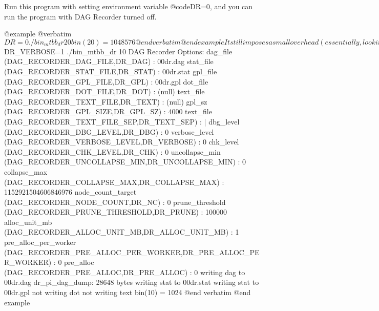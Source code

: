 Run this program with setting environment variable @code{DR=0}, and you
can run the program with DAG Recorder turned off.

@example 
@verbatim
$ DR=0 ./bin_mtbb_dr 20
bin(20) = 1048576
@end verbatim
@end example

It still imposes a small overhead (essentially, looking up a global
variable + branch) for each tasking primitive.  We believe this overhead
is rarely an issue, but if you want to completely eliminate this
overhead, compile the program without @code{DAG_RECORDER=2}.

@node Controlling the Behavior of DAG Recorder,  , Basics of Running Your Programs with DAG Recorder, Running Your Programs with DAG Recorder
@subsection Controlling the Behavior of DAG Recorder

The behavior of DAG Recorder can be controlled either from within the
program or by environment variables; you can pass a pointer to
@code{dr_options} structure to @code{dr_start}, which has been 0 in the
examples we have shown so far.  If the argument to @code{dr_start} is
null (zero), options can be set via environment variables.  We will
illustrate how they work.

First about environment variables.  Run the program with setting the
environment variable @code{DR_VERBOSE} to @code{1}, and you will see the
list of environment variables and their values printed by
@code{dr_start}.  You will also see messages about files generated by
@code{dr_dump}.

@example 
@verbatim
$ DR_VERBOSE=1 ./bin_mtbb_dr 10
DAG Recorder Options:
dag_file (DAG_RECORDER_DAG_FILE,DR_DAG) : 00dr.dag
stat_file (DAG_RECORDER_STAT_FILE,DR_STAT) : 00dr.stat
gpl_file (DAG_RECORDER_GPL_FILE,DR_GPL) : 00dr.gpl
dot_file (DAG_RECORDER_DOT_FILE,DR_DOT) : (null)
text_file (DAG_RECORDER_TEXT_FILE,DR_TEXT) : (null)
gpl_sz (DAG_RECORDER_GPL_SIZE,DR_GPL_SZ) : 4000
text_file (DAG_RECORDER_TEXT_FILE_SEP,DR_TEXT_SEP) : |
dbg_level (DAG_RECORDER_DBG_LEVEL,DR_DBG) : 0
verbose_level (DAG_RECORDER_VERBOSE_LEVEL,DR_VERBOSE) : 0
chk_level (DAG_RECORDER_CHK_LEVEL,DR_CHK) : 0
uncollapse_min (DAG_RECORDER_UNCOLLAPSE_MIN,DR_UNCOLLAPSE_MIN) : 0
collapse_max (DAG_RECORDER_COLLAPSE_MAX,DR_COLLAPSE_MAX) : 1152921504606846976
node_count_target (DAG_RECORDER_NODE_COUNT,DR_NC) : 0
prune_threshold (DAG_RECORDER_PRUNE_THRESHOLD,DR_PRUNE) : 100000
alloc_unit_mb (DAG_RECORDER_ALLOC_UNIT_MB,DR_ALLOC_UNIT_MB) : 1
pre_alloc_per_worker (DAG_RECORDER_PRE_ALLOC_PER_WORKER,DR_PRE_ALLOC_PER_WORKER) : 0
pre_alloc (DAG_RECORDER_PRE_ALLOC,DR_PRE_ALLOC) : 0
writing dag to 00dr.dag
dr_pi_dag_dump: 28648 bytes
writing stat to 00dr.stat
writing stat to 00dr.gpl
not writing dot
not writing text
bin(10) = 1024
@end verbatim
@end example

